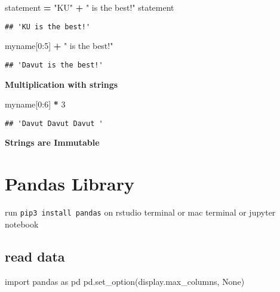 \documentclass[
]{book}
\newenvironment{Shaded}{\begin{snugshade}}{\end{snugshade}}
\newcommand{\DecValTok}[1]{\textcolor[rgb]{0.00,0.00,0.81}{#1}}
\newcommand{\ImportTok}[1]{#1}
\newcommand{\NormalTok}[1]{#1}
\newcommand{\OperatorTok}[1]{\textcolor[rgb]{0.81,0.36,0.00}{\textbf{#1}}}
\newcommand{\StringTok}[1]{\textcolor[rgb]{0.31,0.60,0.02}{#1}}
\newcommand{\VariableTok}[1]{\textcolor[rgb]{0.00,0.00,0.00}{#1}}
\begin{document}
\begin{Shaded}
\begin{Highlighting}[]
\NormalTok{statement }\OperatorTok{=} \StringTok{"KU"} \OperatorTok{+} \StringTok{" is the best!"}  
\NormalTok{statement}
\end{Highlighting}
\end{Shaded}

\begin{verbatim}
## 'KU is the best!'
\end{verbatim}

\begin{Shaded}
\begin{Highlighting}[]
\NormalTok{myname[}\DecValTok{0}\NormalTok{:}\DecValTok{5}\NormalTok{] }\OperatorTok{+} \StringTok{" is the best!"}
\end{Highlighting}
\end{Shaded}

\begin{verbatim}
## 'Davut is the best!'
\end{verbatim}

\textbf{Multiplication with strings}

\begin{Shaded}
\begin{Highlighting}[]
\NormalTok{myname[}\DecValTok{0}\NormalTok{:}\DecValTok{6}\NormalTok{] }\OperatorTok{*} \DecValTok{3}
\end{Highlighting}
\end{Shaded}

\begin{verbatim}
## 'Davut Davut Davut '
\end{verbatim}

\textbf{Strings are Immutable}

\hypertarget{pandas-library}{%
\chapter{Pandas Library}\label{pandas-library}}

run \texttt{pip3\ install\ pandas}
on rstudio terminal or mac terminal or jupyter notebook

\hypertarget{read-data}{%
\section{read data}\label{read-data}}

\begin{Shaded}
\begin{Highlighting}[]
\ImportTok{import}\NormalTok{ pandas }\ImportTok{as}\NormalTok{ pd }
\NormalTok{pd.set\_option(}\StringTok{\textquotesingle{}display.max\_columns\textquotesingle{}}\NormalTok{, }\VariableTok{None}\NormalTok{)}
\end{Highlighting}
\end{Shaded}
\end{document}
